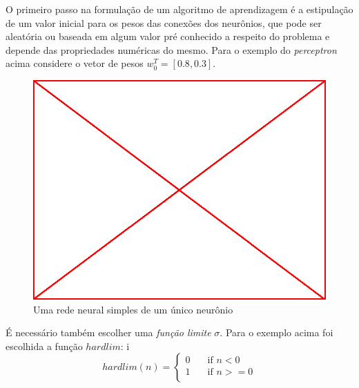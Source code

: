 O primeiro passo na formulação de um algoritmo de aprendizagem é a estipulação
de um valor inicial para os pesos das conexões dos neurônios, que pode ser
aleatória ou baseada em algum valor pré conhecido a respeito do problema e
depende das propriedades numéricas do mesmo. Para o exemplo do
\emph{perceptron} acima considere o vetor de pesos $w_0^T=[0.8,0.3]$.

\begin{figure}\label{fig:simple-perceptron}
  \caption{Uma rede neural simples de um único neurônio}
  \begin{center}
    \includegraphics[scale=0.5]{placeholder}
  \end{center}
\end{figure}

É necessário também escolher uma \emph{função limite} $\sigma$. Para o exemplo
acima foi escolhida a função $hardlim$:
i
$$
hardlim(n) = \begin{cases}
  0 & \quad \text{if~} n<0\\
  1 & \quad \text{if~} n>=0\\
  \end{cases}
$$

